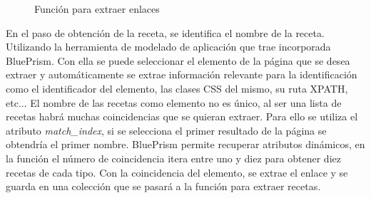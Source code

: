 \begin{figure}[H]
    \centering
    \caption{Función para extraer enlaces}
    \label{fig:links}
\end{figure}

En el paso de obtención de la receta, se identifica el nombre de la receta. Utilizando la herramienta de modelado de aplicación que trae incorporada BluePrism. Con ella se puede seleccionar el elemento de la página que se desea extraer y automáticamente se extrae información relevante para la identificación como el identificador del elemento, las clases CSS del mismo, su ruta XPATH, etc... El nombre de las recetas como elemento no es único, al ser una lista de recetas habrá muchas coincidencias que se quieran extraer. Para ello se utiliza el atributo \emph{match\_index}, si se selecciona el primer resultado de la página se obtendría el primer nombre. BluePrism permite recuperar atributos dinámicos, en la función el número de coincidencia itera entre uno y diez para obtener diez recetas de cada tipo. Con la coincidencia del elemento, se extrae el enlace y se guarda en una colección que se pasará a la función para extraer recetas. 

